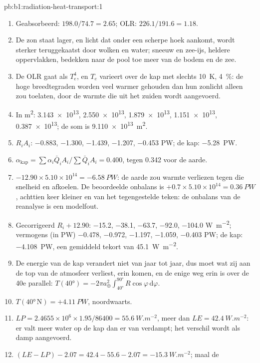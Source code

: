 \begin{solution}{pb:b1:radiation-heat-transport:1}
\begin{enumerate}
        \num{242.9}, \num{241.1} \unit{K}.
  \item Geabsorbeerd: $198.0/74.7 = 2.65$; OLR: $226.1/191.6 = 1.18$.
  \item De zon staat lager, en licht dat onder een scherpe hoek aankomt, wordt sterker teruggekaatst door wolken en water; sneeuw en zee-ijs, heldere oppervlakken, bedekken naar de pool toe meer van de bodem en de zee.
  \item De OLR gaat als $T_e^4$, en $T_e$ varieert over de kap met slechts \qty{10}{K}, \qty{4}{\percent}: de hoge breedtegraden worden veel warmer gehouden dan hun zonlicht alleen zou toelaten, door de warmte die uit het zuiden wordt aangevoerd.
  \item In \unit{m^2}: \num{3.143e13}, \num{2.550e13}, \num{1.879e13},
        \num{1.151e13}, \num{0.387e13}; de som is \qty{9.110e13}{m^2}.
  \item $R_iA_i$: \num{-0.883}, \num{-1.300}, \num{-1.439}, \num{-1.207},
        \num{-0.453} \unit{PW}; de kap: \qty{-5.28}{PW}.
  \item $\alpha_\text{kap} = \sum\alpha_i\bar Q_iA_i/\sum\bar Q_iA_i = 0.400$,
        tegen \num{0.342} voor de aarde.
  \item $-12.90 \times 5.10\times10^{14} = \qty{-6.58}{PW}$: de aarde zou warmte verliezen tegen die snelheid en afkoelen. De beoordeelde onbalans is
        $+0.7 \times 5.10\times10^{14} = \qty{+0.36}{PW}$, achttien keer kleiner en van het tegengestelde teken: de onbalans van de reanalyse is een modelfout.
  \item Gecorrigeerd $R_i + 12.90$: \num{-15.2}, \num{-38.1}, \num{-63.7},
        \num{-92.0}, \num{-104.0} \unit{W.m^{-2}}; vermogens (in PW) \num{-0.478},
        \num{-0.972}, \num{-1.197}, \num{-1.059}, \num{-0.403} \unit{PW}; de kap:
        \qty{-4.108}{PW}, een gemiddeld tekort van \qty{45.1}{W.m^{-2}}.
  \item De energie van de kap verandert niet van jaar tot jaar, dus moet wat zij aan de top van de atmosfeer verliest, erin komen, en de enige weg erin is over de 40e parallel: $T(\ang{40}) = -2\pi a_\oplus^2\int_{\ang{40}}^{\ang{90}}
        R\cos\varphi\,\mathrm d\varphi$.
  \item $T(\ang{40}\,\text{N}) = +\qty{4.11}{PW}$, noordwaarts.
  \item $LP = 2.4655\times10^6 \times 1.95/86400 = \qty{55.6}{W.m^{-2}}$, meer dan
        $LE = \qty{42.4}{W.m^{-2}}$: er valt meer water op de kap dan er van verdampt; het verschil wordt als damp aangevoerd.
  \item $(LE - LP) - 2.07 = 42.4 - 55.6 - 2.07 = \qty{-15.3}{W.m^{-2}}$; maal de

\end{enumerate}
\end{solution}
